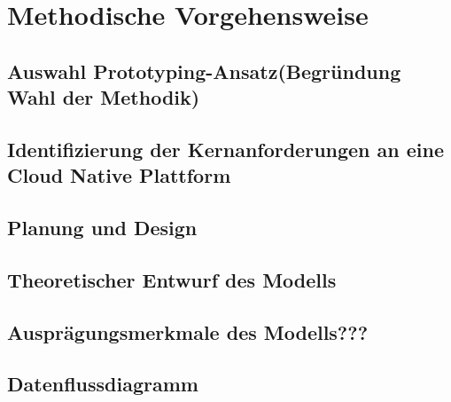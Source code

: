 \newpage
\section{Methodische Vorgehensweise}\label{lab:methodische_vorgehensweise}
\subsection{Auswahl Prototyping-Ansatz(Begründung Wahl der Methodik)}
\subsection{Identifizierung der Kernanforderungen an eine Cloud Native Plattform}
\subsection{Planung und Design}
\subsection{Theoretischer Entwurf des Modells}
\subsection{Ausprägungsmerkmale des Modells???}

\subsection{Datenflussdiagramm}